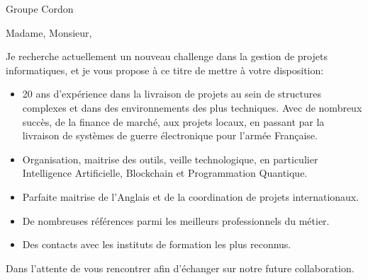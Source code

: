 \documentclass[12pt]{lettre}
\begin{document}
\begin{letter}{Groupe Cordon}
\address{Frederic Kerdraon\\3, La Ville Haussan\\22100 Dinan}
\nofax

\def\concname{Objet :~} %
\opening{Madame, Monsieur,}

Je recherche actuellement un nouveau challenge dans la gestion de projets informatiques, et je vous propose à ce titre de mettre à votre disposition:

\begin{itemize}
\item
20 ans d'expérience dans la livraison de projets au sein de structures complexes et dans des environnements des plus techniques. 
Avec de nombreux succès, de la finance de marché, aux projets locaux, en passant par la livraison de systèmes de guerre électronique pour l'armée Française.
\item
Organisation, maitrise des outils, veille technologique, en particulier Intelligence Artificielle, Blockchain et Programmation Quantique.
\item
Parfaite maitrise de l'Anglais et de la coordination de projets internationaux.
\item
De nombreuses références parmi les meilleurs professionnels du métier.
\item
Des contacts avec les instituts de formation les plus reconnus.
\end{itemize}

\closing{Dans l'attente de vous rencontrer afin d'échanger sur notre future collaboration.}

\end{letter}
\end{document}
